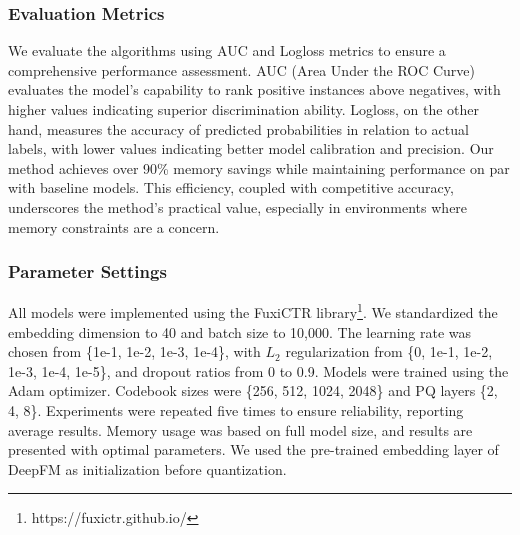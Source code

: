 \subsubsection{Evaluation Metrics}
We evaluate the algorithms using AUC and Logloss metrics to ensure a comprehensive performance assessment. AUC (Area Under the ROC Curve) evaluates the model's capability to rank positive instances above negatives, with higher values indicating superior discrimination ability. Logloss, on the other hand, measures the accuracy of predicted probabilities in relation to actual labels, with lower values indicating better model calibration and precision. Our method achieves over 90\% memory savings while maintaining performance on par with baseline models. This efficiency, coupled with competitive accuracy, underscores the method's practical value, especially in environments where memory constraints are a concern.



\subsubsection{Parameter Settings}
All models were implemented using the FuxiCTR library\footnote{https://fuxictr.github.io/}. We standardized the embedding dimension to 40 and batch size to 10,000. The learning rate was chosen from \{1e-1, 1e-2, 1e-3, 1e-4\}, with $L_2$ regularization from \{0, 1e-1, 1e-2, 1e-3, 1e-4, 1e-5\}, and dropout ratios from 0 to 0.9. Models were trained using the Adam optimizer. Codebook sizes were \{256, 512, 1024, 2048\} and PQ layers \{2, 4, 8\}. Experiments were repeated five times to ensure reliability, reporting average results. Memory usage was based on full model size, and results are presented with optimal parameters. We used the pre-trained embedding layer of DeepFM as initialization before quantization.






